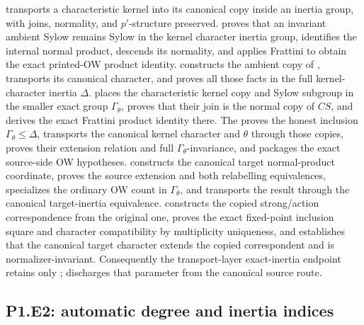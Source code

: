 \documentclass[11pt]{article}
\begin{document}
 transports a
characteristic kernel into its canonical copy inside an inertia group,
with joins, normality, and \(p'\)-structure preserved.
 proves
that an invariant ambient Sylow remains Sylow in the kernel character
inertia group, identifies the internal normal product, descends its
normality, and applies Frattini to obtain the exact printed-OW product
identity.
constructs the ambient copy of , transports its
canonical character, and proves all those facts in the full
kernel-character inertia \(\Delta\).
places the characteristic kernel copy and Sylow subgroup in the smaller
exact group \(\Gamma_\theta\), proves that their join is the normal copy of
\(CS\), and derives the exact Frattini product identity there.  The
proves the honest inclusion \(\Gamma_\theta\leq\Delta\), transports the
canonical kernel character and \(\theta\) through those copies, proves
their extension relation and full \(\Gamma_\theta\)-invariance, and
packages the exact source-side OW hypotheses.
constructs the canonical target normal-product coordinate, proves the
source extension and both relabelling equivalences, specializes the
ordinary OW count in \(\Gamma_\theta\), and transports the result through
the canonical target-inertia equivalence.
constructs the copied strong/action correspondence from the original
one, proves the exact fixed-point inclusion square and character
compatibility by multiplicity uniqueness, and establishes that the
canonical target character extends the copied correspondent and is
normalizer-invariant.  Consequently the transport-layer exact-inertia
endpoint retains only
;
discharges that parameter from the canonical source route.

\subsection{P1.E2: automatic degree and inertia indices}
\end{document}
